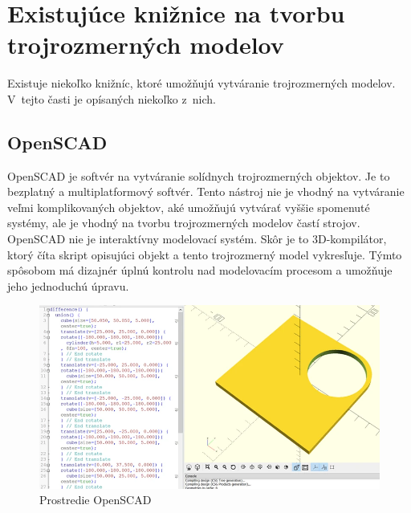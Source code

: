 \section{Existujúce knižnice na tvorbu trojrozmerných  modelov} \label{sec:existing_libraries}
Existuje niekoľko knižníc, ktoré umožňujú vytváranie trojrozmerných modelov. V~tejto časti je opísaných niekoľko z~nich.\nopagebreak

\subsection*{OpenSCAD}
OpenSCAD je softvér na vytváranie solídnych trojrozmerných objektov. Je to bezplatný a multiplatformový softvér. Tento nástroj nie je vhodný na vytváranie veľmi komplikovaných objektov, aké umožňujú vytvárať vyššie spomenuté systémy, ale je vhodný na tvorbu trojrozmerných modelov častí strojov. OpenSCAD nie je interaktívny modelovací systém. Skôr je to 3D-kompilátor, ktorý číta skript opisujúci objekt a tento trojrozmerný model vykresľuje.  Týmto spôsobom má dizajnér úplnú kontrolu nad modelovacím procesom a umožňuje jeho jednoduchú úpravu. \cite{}

\nopagebreak
\begin{figure}[H]
    \centering
    \includegraphics[width = 0.9\linewidth]{obrazky-figures/programs/openSCAD.png}
    \caption{Prostredie OpenSCAD\cite{} }
    \label{fig:OpenSCAD}
\end{figure}


